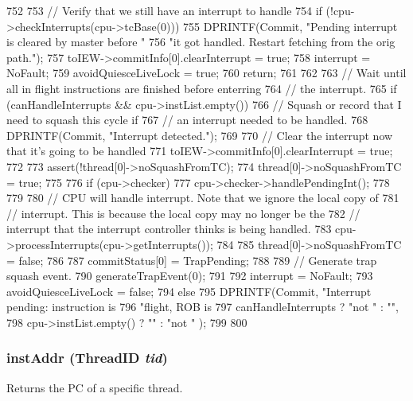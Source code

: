 \begin{DoxyCode}
752 {
753     // Verify that we still have an interrupt to handle
754     if (!cpu->checkInterrupts(cpu->tcBase(0))) {
755         DPRINTF(Commit, "Pending interrupt is cleared by master before "
756                 "it got handled. Restart fetching from the orig path.\n");
757         toIEW->commitInfo[0].clearInterrupt = true;
758         interrupt = NoFault;
759         avoidQuiesceLiveLock = true;
760         return;
761     }
762 
763     // Wait until all in flight instructions are finished before enterring
764     // the interrupt.
765     if (canHandleInterrupts && cpu->instList.empty()) {
766         // Squash or record that I need to squash this cycle if
767         // an interrupt needed to be handled.
768         DPRINTF(Commit, "Interrupt detected.\n");
769 
770         // Clear the interrupt now that it's going to be handled
771         toIEW->commitInfo[0].clearInterrupt = true;
772 
773         assert(!thread[0]->noSquashFromTC);
774         thread[0]->noSquashFromTC = true;
775 
776         if (cpu->checker) {
777             cpu->checker->handlePendingInt();
778         }
779 
780         // CPU will handle interrupt. Note that we ignore the local copy of
781         // interrupt. This is because the local copy may no longer be the
782         // interrupt that the interrupt controller thinks is being handled.
783         cpu->processInterrupts(cpu->getInterrupts());
784 
785         thread[0]->noSquashFromTC = false;
786 
787         commitStatus[0] = TrapPending;
788 
789         // Generate trap squash event.
790         generateTrapEvent(0);
791 
792         interrupt = NoFault;
793         avoidQuiesceLiveLock = false;
794     } else {
795         DPRINTF(Commit, "Interrupt pending: instruction is %
796                 "flight, ROB is %
797                 canHandleInterrupts ? "not " : "",
798                 cpu->instList.empty() ? "" : "not " );
799     }
800 }
\end{DoxyCode}
\hypertarget{classDefaultCommit_afae6152cf4b3a51162d6e64247c1ac09}{
\subsubsection[{instAddr}]{ instAddr ({\bf ThreadID} {\em tid})}}
\label{classDefaultCommit_afae6152cf4b3a51162d6e64247c1ac09}
Returns the PC of a specific thread. 


